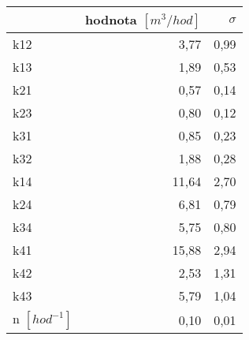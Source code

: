 \begin{tabular}{lrr}
\toprule
{} &  hodnota $\left[\si{m^3/hod}\right]$ &  $\sigma$ \\
\midrule
k12&    3,77 &  0,99 \\
k13&    1,89 &  0,53 \\
k21&    0,57 &  0,14 \\
k23&    0,80 &  0,12 \\
k31&    0,85 &  0,23 \\
k32&    1,88 &  0,28 \\
k14&   11,64 &  2,70 \\
k24&    6,81 &  0,79 \\
k34&    5,75 &  0,80 \\
k41&   15,88 &  2,94 \\
k42&    2,53 &  1,31 \\
k43&    5,79 &  1,04 \\
n $[\si{hod^{-1}}]$ &                                 0,10 &      0,01 \\
\bottomrule
\end{tabular}
